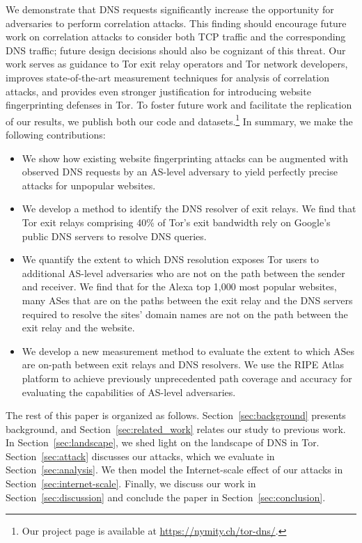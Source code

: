 We demonstrate that DNS requests significantly increase the opportunity
for adversaries to perform correlation attacks. This finding should
encourage future work on correlation attacks to consider both TCP
traffic and the corresponding DNS traffic; future design decisions
should also be cognizant of this threat.
Our work \first serves as guidance to Tor exit
relay operators and Tor network developers, \second improves
state-of-the-art measurement techniques for analysis of correlation attacks, and \third
provides even stronger justification for introducing website fingerprinting defenses in
Tor.  To foster future work and facilitate the replication of
our results, we publish both our code and datasets.\footnote{Our project page is
available at \url{https://nymity.ch/tor-dns/}.}
In summary, we make the following contributions:
\begin{itemize}

\item We show how existing website fingerprinting attacks can be
  augmented with observed DNS requests by an AS-level adversary to
  yield perfectly precise \name attacks for unpopular websites.

\item We develop a method to identify the DNS resolver of exit
  relays. We find that Tor exit relays comprising 40\% of Tor's exit
  bandwidth rely on Google's public DNS servers to resolve DNS queries.

\item We quantify the extent to which DNS resolution exposes Tor users
  to additional AS-level adversaries who are not on the path between the
  sender and receiver.  We find that for the Alexa top 1,000 most
  popular websites, many ASes that are on the paths between the
  exit relay and the DNS servers required to resolve the sites' domain
  names are not on the path between the exit relay and the website.

\item We develop a new measurement method to evaluate the extent to
  which ASes are on-path between exit relays and DNS resolvers. We use
  the RIPE Atlas~\cite{atlas} platform to achieve previously
  unprecedented path coverage and accuracy for evaluating the
  capabilities of AS-level adversaries.
\end{itemize}
\noindent
The rest of this paper is organized as follows.
Section~\ref{sec:background} presents background, and
Section~\ref{sec:related_work} relates our study to previous work.  In
Section~\ref{sec:landscape}, we shed light on the landscape of DNS in
Tor.  Section~\ref{sec:attack} discusses our \name attacks, which we
evaluate in Section~\ref{sec:analysis}.  We then model the
Internet-scale effect of our attacks in
Section~\ref{sec:internet-scale}.  Finally, we discuss our work in
Section~\ref{sec:discussion} and conclude the paper in
Section~\ref{sec:conclusion}.
